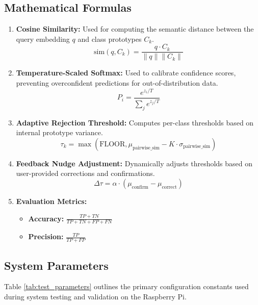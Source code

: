 \documentclass[12pt,a4paper]{report}
\begin{document}
\subsection{Mathematical Formulas}
\begin{enumerate}
    \item \textbf{Cosine Similarity:} Used for computing the semantic distance between the query embedding $q$ and class prototypes $C_k$.
    \begin{equation}
        \text{sim}(q, C_k) = \frac{q \cdot C_k}{\|q\| \|C_k\|}
    \end{equation}

    \item \textbf{Temperature-Scaled Softmax:} Used to calibrate confidence scores, preventing overconfident predictions for out-of-distribution data.
    \begin{equation}
        P_i = \frac{e^{z_i / T}}{\sum_{j} e^{z_j / T}}
    \end{equation}

    \item \textbf{Adaptive Rejection Threshold:} Computes per-class thresholds based on internal prototype variance.
    \begin{equation}
        \tau_k = \max(\text{FLOOR}, \mu_{\text{pairwise\_sim}} - K \cdot \sigma_{\text{pairwise\_sim}})
    \end{equation}

    \item \textbf{Feedback Nudge Adjustment:} Dynamically adjusts thresholds based on user-provided corrections and confirmations.
    \begin{equation}
        \Delta \tau = \alpha \cdot (\mu_{\text{confirm}} - \mu_{\text{correct}})
    \end{equation}

    \item \textbf{Evaluation Metrics:}
    \begin{itemize}
        \item \textbf{Accuracy:} $\frac{TP + TN}{TP + TN + FP + FN}$
        \item \textbf{Precision:} $\frac{TP}{TP + FP}$
    \end{itemize}
\end{enumerate}

\subsection{System Parameters}
Table \ref{tab:test_parameters} outlines the primary configuration constants used during system testing and validation on the Raspberry Pi.
\end{document}
